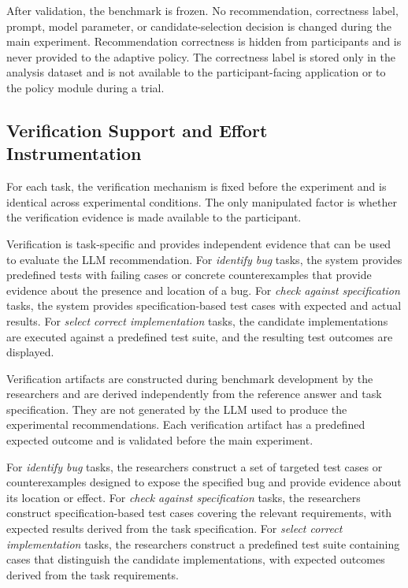 \documentclass[oneside,final,14pt,a4paper]{extreport}
\begin{document}
After validation, the benchmark is frozen. No recommendation, correctness 
label, prompt, model parameter, or candidate-selection decision is changed 
during the main experiment. Recommendation correctness is hidden from 
participants and is never provided to the adaptive policy. The correctness
label is stored only in the analysis dataset and is not available to the
participant-facing application or to the policy module during a trial.


\subsection{Verification Support and Effort Instrumentation}
\label{subsec:burden}

For each task, the verification mechanism is fixed before the experiment 
and is identical across experimental conditions. The only manipulated factor 
is whether the verification evidence is made available to the participant.

Verification is task-specific and provides independent evidence that 
can be used to evaluate the LLM recommendation. For \emph{identify bug} tasks, 
the system provides predefined tests with failing cases or concrete 
counterexamples that provide evidence about the presence and location of a bug. 
For \emph{check against specification} tasks, the system provides 
specification-based test cases with expected and actual results. For 
\emph{select correct implementation} tasks, the candidate implementations are 
executed against a predefined test suite, and the resulting test outcomes are 
displayed.

Verification artifacts are constructed during benchmark development 
by the researchers and are derived independently from the reference answer 
and task specification. They are not generated by the LLM used to produce 
the experimental recommendations. Each verification artifact has a predefined 
expected outcome and is validated before the main experiment.

For \emph{identify bug} tasks, the researchers construct a set of targeted 
test cases or counterexamples designed to expose the specified bug and provide 
evidence about its location or effect. For \emph{check against specification} 
tasks, the researchers construct specification-based test cases covering the 
relevant requirements, with expected results derived from the task 
specification. For \emph{select correct implementation} tasks, the 
researchers construct a predefined test suite containing cases that 
distinguish the candidate implementations, with expected outcomes derived 
from the task requirements.
\end{document}
